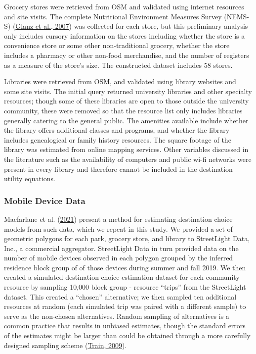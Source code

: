 \documentclass[review, 3p]{elsarticle} %
\begin{document}
Grocery stores were retrieved from OSM and validated using internet resources and
site visits. The complete Nutritional Environment Measures Survey (NEMS-S) (\protect\hyperlink{ref-glanz2007}{Glanz et al., 2007})
was collected for each store, but this preliminary analysis only includes
cursory information on the stores including whether the store is a convenience store
or some other non-traditional grocery, whether the store includes a pharmacy or
other non-food merchandise, and the number of registers as a measure of the
store's size. The constructed dataset includes 58 stores.

Libraries were retrieved from OSM, and validated using library websites and
some site visits. The initial query returned university libraries and other
specialty resources; though some of these libraries are open to those outside
the university community, these were removed so that the resource list only
includes libraries generally catering to the general public. The amenities
available include whether the library offers additional classes and programs,
and whether the library includes genealogical or family history resources. The
square footage of the library was estimated from online mapping services.
Other variables discussed in the literature such as the availability of computers
and public wi-fi networks were present in every library and therefore cannot
be included in the destination utility equations.

\hypertarget{mobile-device-data}{%
\subsubsection{Mobile Device Data}\label{mobile-device-data}}

Macfarlane et al. (\protect\hyperlink{ref-alamedaparks}{2021}) present a method for estimating destination choice models from
such data, which we repeat in this study. We provided a set of geometric
polygons for each park, grocery store, and library to StreetLight Data, Inc., a
commercial aggregator. StreetLight Data in turn provided data on the number of
mobile devices observed in each polygon grouped by the inferred residence block
group of of those devices during summer and fall 2019.
We then created a simulated destination choice estimation dataset for each
community resource by sampling 10,000 block group - resource ``trips'' from the
StreetLight dataset. This created a ``chosen'' alternative; we then sampled ten additional
resources at random (each simulated trip was paired with a different sample) to
serve as the non-chosen alternatives. Random sampling of alternatives is a
common practice that results in unbiased estimates, though the standard errors
of the estimates might be larger than could be obtained through a more carefully
designed sampling scheme (\protect\hyperlink{ref-train2009}{Train, 2009}).
\end{document}
